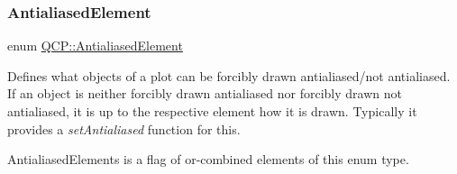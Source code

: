\subsubsection{\texorpdfstring{AntialiasedElement}{AntialiasedElement}}
{\footnotesize\ttfamily enum \mbox{\hyperlink{namespace_q_c_p_ae55dbe315d41fe80f29ba88100843a0c}{Q\+C\+P\+::\+Antialiased\+Element}}}

Defines what objects of a plot can be forcibly drawn antialiased/not antialiased. If an object is neither forcibly drawn antialiased nor forcibly drawn not antialiased, it is up to the respective element how it is drawn. Typically it provides a {\itshape set\+Antialiased} function for this.

{\ttfamily Antialiased\+Elements} is a flag of or-\/combined elements of this enum type.

